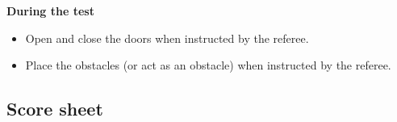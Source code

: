 \textbf{During the test}
\begin{itemize}
	\item Open and close the doors when instructed by the referee.
	\item Place the obstacles (or act as an obstacle) when instructed by the referee.
\end{itemize}

\newpage

\subsection{Score sheet}


